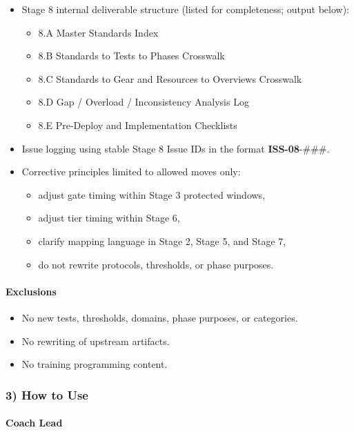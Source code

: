 \documentclass[10pt]{article}
\begin{document}
\begin{itemize}
\item Stage 8 internal deliverable structure (listed for completeness; output below):
  \begin{itemize}
  \item 8.A Master Standards Index
  \item 8.B Standards to Tests to Phases Crosswalk
  \item 8.C Standards to Gear and Resources to Overviews Crosswalk
  \item 8.D Gap / Overload / Inconsistency Analysis Log
  \item 8.E Pre-Deploy and Implementation Checklists
  \end{itemize}
\item Issue logging using stable Stage 8 Issue IDs in the format \textbf{ISS-08}-\#\#\#.
\item Corrective principles limited to allowed moves only:
  \begin{itemize}
  \item adjust gate timing within Stage 3 protected windows,
  \item adjust tier timing within Stage 6,
  \item clarify mapping language in Stage 2, Stage 5, and Stage 7,
  \item do not rewrite protocols, thresholds, or phase purposes.
  \end{itemize}
\end{itemize}

\paragraph*{Exclusions}

\begin{itemize}
\item No new tests, thresholds, domains, phase purposes, or categories.
\item No rewriting of upstream artifacts.
\item No training programming content.
\end{itemize}

\subsubsection*{3) How to Use}

\paragraph*{Coach Lead}
\end{document}
